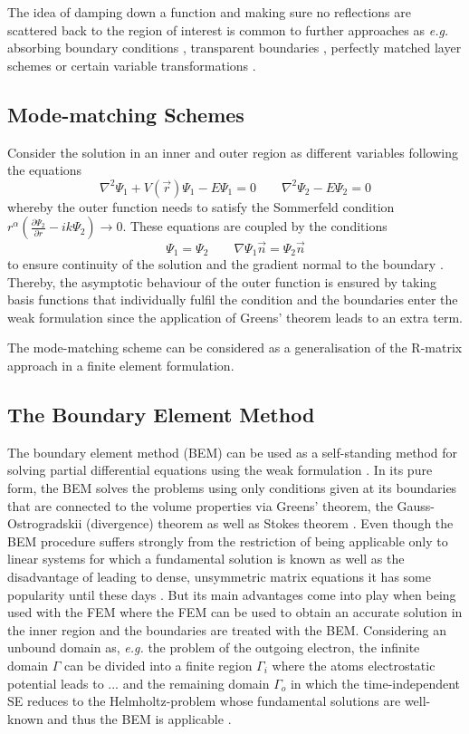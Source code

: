 The idea of damping down a function and making sure no reflections are scattered back to the region of interest is common to further approaches as \textit{e.g.} absorbing boundary conditions \cite{Engquist}, transparent boundaries \cite{HelmhPrec}, perfectly matched layer schemes \cite{pmlBook,pml1, pml2} or certain variable transformations \cite{taoDVR}.

\subsection{Mode-matching Schemes}
Consider the solution in an inner and outer region as different variables following the equations
\begin{equation}
   \nabla^2\Psi_1 +V(\vec{r})\Psi_1-E\Psi_1=0 \qquad \nabla^2\Psi_2 -E\Psi_2=0 
\end{equation}
whereby the outer function needs to satisfy the Sommerfeld condition $r^\alpha \left(\frac{\partial \Psi_2}{\partial r} - ik \Psi_2  \right)\rightarrow 0$.
These equations are coupled by the conditions
\begin{equation}
\Psi_1=\Psi_2  \qquad \nabla \Psi_1 \vec{n}=\Psi_2 \vec{n}
\end{equation}
to ensure continuity of the solution and the gradient normal to the boundary \cite{AstleyMM}.
Thereby, the asymptotic behaviour of the outer function is ensured by taking basis functions that individually fulfil the condition and the boundaries enter the weak formulation since the application of Greens' theorem leads to an extra term.

The mode-matching scheme can be considered as a generalisation of the R-matrix approach in a finite element formulation.

\subsection{The Boundary Element Method}
The boundary element method (BEM) can be used as a self-standing method for solving partial differential equations using the weak formulation \cite{bemDai,bemCostabel}.
In its pure form, the BEM solves the problems using only conditions given at its boundaries that are connected to the volume properties via Greens' theorem, the Gauss-Ostrogradskii (divergence) theorem as well as Stokes theorem \cite{bemBook}.
Even though the BEM procedure suffers strongly from the restriction of being applicable only to linear systems for which a fundamental solution is known as well as the disadvantage of leading to dense, unsymmetric matrix equations \cite{bemCostabel} it has some popularity until these days \cite{bem1,bem2,bem3}.
But its main advantages come into play when being used with the FEM \cite{bem-fem} where the FEM can be used to obtain an accurate solution in the inner region and the boundaries are treated with the BEM.
Considering an unbound domain as, \textit{e.g.} the problem of the outgoing electron, the infinite domain $\Gamma$ can be divided into a finite region $\Gamma_i$ where the atoms electrostatic potential leads to ... and the remaining domain $\Gamma_o$ in which the time-independent SE reduces to the Helmholtz-problem whose fundamental solutions are well-known and thus the BEM is applicable \cite{bemCostabel, bettessBEM}.


